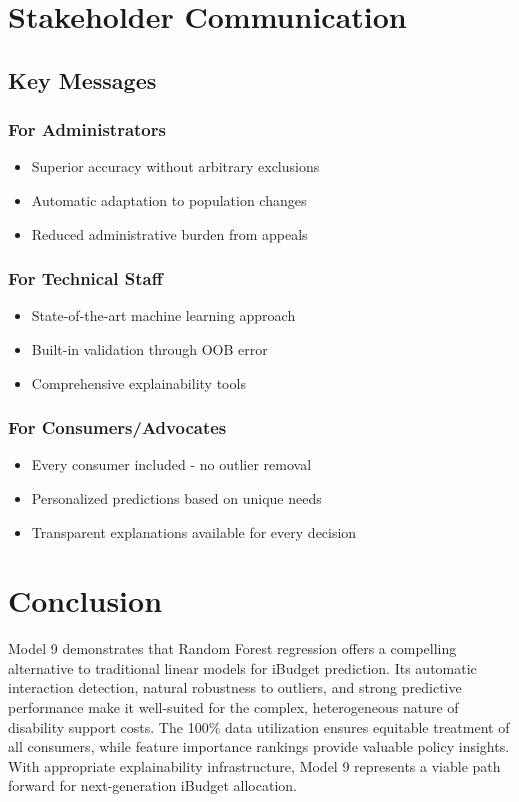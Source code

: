 \section{Stakeholder Communication}

\subsection{Key Messages}

\subsubsection{For Administrators}
\begin{itemize}
    \item Superior accuracy without arbitrary exclusions
    \item Automatic adaptation to population changes
    \item Reduced administrative burden from appeals
\end{itemize}

\subsubsection{For Technical Staff}
\begin{itemize}
    \item State-of-the-art machine learning approach
    \item Built-in validation through OOB error
    \item Comprehensive explainability tools
\end{itemize}

\subsubsection{For Consumers/Advocates}
\begin{itemize}
    \item Every consumer included - no outlier removal
    \item Personalized predictions based on unique needs
    \item Transparent explanations available for every decision
\end{itemize}


\section{Conclusion}

Model 9 demonstrates that Random Forest regression offers a compelling alternative to traditional linear models for iBudget prediction. Its automatic interaction detection, natural robustness to outliers, and strong predictive performance make it well-suited for the complex, heterogeneous nature of disability support costs. The 100\% data utilization ensures equitable treatment of all consumers, while feature importance rankings provide valuable policy insights. With appropriate explainability infrastructure, Model 9 represents a viable path forward for next-generation iBudget allocation.